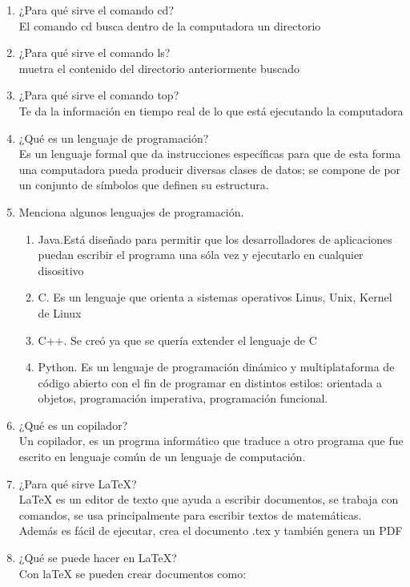 \documentclass[letterpaper, 12pt, oneside]{article}%
\begin{document}
\begin{enumerate}
		\item 
		¿Para qué sirve el comando cd?\\
		El comando cd busca dentro de la computadora un directorio
		\item 
		¿Para qué sirve el comando ls?\\
		muetra el contenido del directorio anteriormente buscado
		\item 
		¿Para qué sirve el comando top?\\
		Te da la información en tiempo real de lo que está ejecutando la computadora
		\item 
		¿Qué es un lenguaje de programación?\\
		Es un lenguaje formal que da instrucciones específicas para que de esta forma una computadora pueda producir diversas clases de datos; se compone de por un conjunto de símbolos que definen su estructura.
		\item 
		Menciona algunos lenguajes de programación.\\
		\begin{enumerate}
			\item 
			Java.Está diseñado para permitir que los desarrolladores de aplicaciones puedan escribir el programa una sóla vez y ejecutarlo en cualquier disositivo
			\item 
			C. Es un lenguaje que orienta a sistemas operativos Linus, Unix, Kernel de Linux
			\item
			C++. Se creó ya que se quería extender el lenguaje de C
			\item 
			Python. Es un lenguaje de programación dinámico y multiplataforma de código abierto con el fin de programar en distintos estilos: orientada a objetos, programación imperativa, programación funcional.
		\end{enumerate}		
		\item 
		¿Qué es un copilador?\\
		Un copilador, es un progrma informático que traduce a otro programa que fue escrito en lenguaje común de un lenguaje de computación.
		\item 
		¿Para qué sirve LaTeX?\\
		LaTeX es un editor de texto que ayuda a escribir documentos, se trabaja con comandos, se usa principalmente para escribir textos de matemáticas.
		Además es fácil de ejecutar, crea el documento .tex y también genera un PDF 
		\item 
		¿Qué se puede hacer en LaTeX?\\
		Con laTeX se pueden crear documentos como:
		

\end{enumerate}
\end{document}
